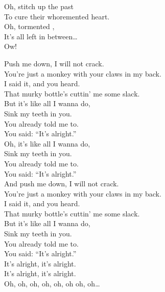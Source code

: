 Oh, stitch up the past \\
To cure their whoremented heart. \\

Oh, tormented , \\
It's all left in between… \\
Ow! \\




Push me down, I will not crack. \\
You're just a monkey with your claws in my back. \\
I said it, and you heard. \\
That murky bottle's cuttin' me some slack. \\

But it's like all I wanna do, \\
Sink my teeth in you. \\
You already told me to. \\
You said: ``It's alright.'' \\

Oh, it's like all I wanna do, \\
Sink my teeth in you. \\
You already told me to. \\
You said: ``It's alright.'' \\

And push me down, I will not crack. \\
You're just a monkey with your claws in my back. \\
I said it, and you heard. \\
That murky bottle's cuttin' me some slack. \\

But it's like all I wanna do, \\
Sink my teeth in you. \\
You already told me to. \\
You said: ``It's alright.'' \\

It's alright, it's alright. \\
It's alright, it's alright. \\

Oh, oh, oh, oh, oh, oh oh, oh… \\

